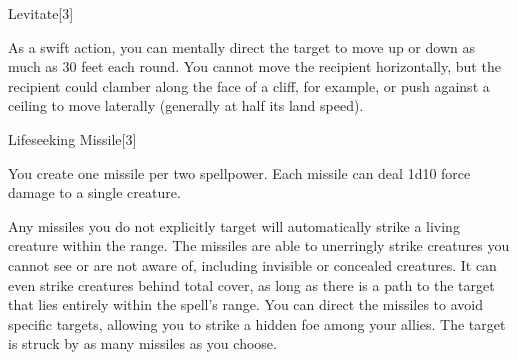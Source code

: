 \begin{spellsection}{Levitate}[3]
    \begin{spellheader}
    \end{spellheader}
    \begin{spellcontent}
        \begin{spelltargetinginfo}
            \spellrng{\rngclose}
        \end{spelltargetinginfo}
        \begin{spelleffects}
            \spelleffect As a swift action, you can mentally direct the target to move up or down as much as 30 feet each round. You cannot move the recipient horizontally, but the recipient could clamber along the face of a cliff, for example, or push against a ceiling to move laterally (generally at half its land speed).
            \spelldur \durshort \dismissable
        \end{spelleffects}
    \end{spellcontent}
    \begin{spellfooter}
        \miscastrandom
    \end{spellfooter}
\end{spellsection}

\begin{spellsection}{Lifeseeking Missile}[3]
    \begin{spellheader}
    \end{spellheader}
    \begin{spellcontent}
        \begin{spelltargetinginfo}
        \end{spelltargetinginfo}
        \begin{spelleffects}
            \spellspecial You create one missile per two spellpower. Each missile can deal 1d10 force damage to a single creature.

            Any missiles you do not explicitly target will automatically strike a living creature within the range. The missiles are able to unerringly strike creatures you cannot see or are not aware of, including invisible or concealed creatures. It can even strike creatures behind total cover, as long as there is a path to the target that lies entirely within the spell's range. You can direct the missiles to avoid specific targets, allowing you to strike a hidden foe among your allies.
            \spelleffect The target is struck by as many missiles as you choose.
        \end{spelleffects}
    \end{spellcontent}
    \begin{spellfooter}
        \miscastexplode
    \end{spellfooter}
\end{spellsection}

